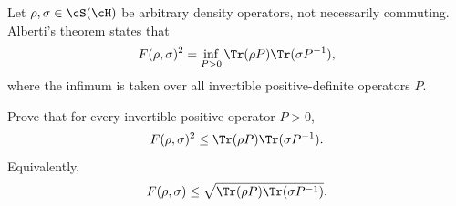 Let $\rho,\sigma\in \cS(\cH)$ be arbitrary density operators, not necessarily commuting. Alberti's theorem states that
$$
F(\rho,\sigma)^2
=
\inf_{P>0}
\Tr(\rho P)\Tr(\sigma P^{-1}),
$$
where the infimum is taken over all invertible positive-definite operators $P$.

Prove that for every invertible positive operator $P>0$,
$$
F(\rho,\sigma)^2
\leq
\Tr(\rho P)\Tr(\sigma P^{-1}).
$$
Equivalently,
$$
F(\rho,\sigma)
\leq
\sqrt{\Tr(\rho P)\Tr(\sigma P^{-1})}.
$$
